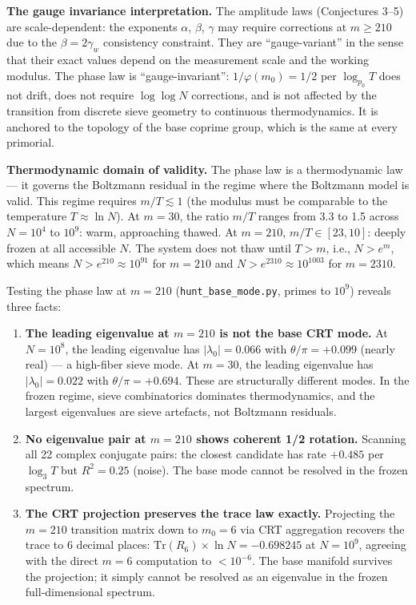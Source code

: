 \documentclass[
  11pt,
]{article}
\numberwithin{equation}{section}
\begin{document}
\textbf{The gauge invariance interpretation.} The amplitude laws
(Conjectures 3--5) are scale-dependent: the exponents \(\alpha\),
\(\beta\), \(\gamma\) may require corrections at \(m \geq 210\) due to
the \(\beta = 2\gamma_w\) consistency constraint. They are
``gauge-variant'' in the sense that their exact values depend on the
measurement scale and the working modulus. The phase law is
``gauge-invariant'': \(1/\varphi(m_0) = 1/2\) per \(\log_{p_0} T\) does
not drift, does not require \(\log\log N\) corrections, and is not
affected by the transition from discrete sieve geometry to continuous
thermodynamics. It is anchored to the topology of the base coprime
group, which is the same at every primorial.

\textbf{Thermodynamic domain of validity.} The phase law is a
thermodynamic law --- it governs the Boltzmann residual in the regime
where the Boltzmann model is valid. This regime requires
\(m/T \lesssim 1\) (the modulus must be comparable to the temperature
\(T \approx \ln N\)). At \(m = 30\), the ratio \(m/T\) ranges from 3.3
to 1.5 across \(N = 10^4\) to \(10^9\): warm, approaching thawed. At
\(m = 210\), \(m/T \in [23, 10]\): deeply frozen at all accessible
\(N\). The system does not thaw until \(T > m\), i.e., \(N > e^m\),
which means \(N > e^{210} \approx 10^{91}\) for \(m = 210\) and
\(N > e^{2310} \approx 10^{1003}\) for \(m = 2310\).

Testing the phase law at \(m = 210\) (\texttt{hunt\_base\_mode.py},
primes to \(10^9\)) reveals three facts:

\begin{enumerate}
\def\labelenumi{\arabic{enumi}.}
\item
  \textbf{The leading eigenvalue at \(m = 210\) is not the base CRT
  mode.} At \(N = 10^8\), the leading eigenvalue has
  \(|\lambda_0| = 0.066\) with \(\theta/\pi = +0.099\) (nearly real) ---
  a high-fiber sieve mode. At \(m = 30\), the leading eigenvalue has
  \(|\lambda_0| = 0.022\) with \(\theta/\pi = +0.694\). These are
  structurally different modes. In the frozen regime, sieve
  combinatorics dominates thermodynamics, and the largest eigenvalues
  are sieve artefacts, not Boltzmann residuals.
\item
  \textbf{No eigenvalue pair at \(m = 210\) shows coherent 1/2
  rotation.} Scanning all 22 complex conjugate pairs: the closest
  candidate has rate \(+0.485\) per \(\log_3 T\) but \(R^2 = 0.25\)
  (noise). The base mode cannot be resolved in the frozen spectrum.
\item
  \textbf{The CRT projection preserves the trace law exactly.}
  Projecting the \(m = 210\) transition matrix down to \(m_0 = 6\) via
  CRT aggregation recovers the trace to 6 decimal places:
  \(\text{Tr}(R_6) \times \ln N = -0.698245\) at \(N = 10^9\), agreeing
  with the direct \(m = 6\) computation to \(< 10^{-6}\). The base
  manifold survives the projection; it simply cannot be resolved as an
  eigenvalue in the frozen full-dimensional spectrum.
\end{enumerate}
\end{document}

